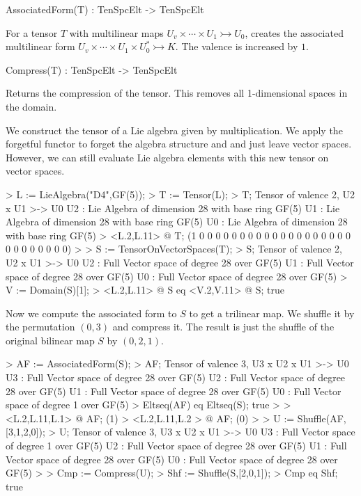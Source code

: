 
\begin{intrinsics}
AssociatedForm(T) : TenSpcElt -> TenSpcElt
\end{intrinsics}

For a tensor $T$ with multilinear maps $U_v\times \cdots \times U_1\rightarrowtail U_0$,
creates the associated multilinear form
$U_v\times\cdots\times U_1\times U_0^*\rightarrowtail K$.  The valence is increased
by $1$.

\begin{intrinsics}
Compress(T) : TenSpcElt -> TenSpcElt
\end{intrinsics}

Returns the compression of the tensor. This removes all 1-dimensional spaces 
in the domain.

\begin{example}
We construct the tensor of a Lie algebra given by multiplication. 
We apply the forgetful functor to forget the algebra structure and and just leave vector spaces.
However, we can still evaluate Lie algebra elements with this new tensor on vector spaces.

\begin{code}
> L := LieAlgebra("D4",GF(5));
> T := Tensor(L); 
> T;
Tensor of valence 2, U2 x U1 >-> U0
U2 : Lie Algebra of dimension 28 with base ring GF(5)
U1 : Lie Algebra of dimension 28 with base ring GF(5)
U0 : Lie Algebra of dimension 28 with base ring GF(5)
> <L.2,L.11> @ T;
(1 0 0 0 0 0 0 0 0 0 0 0 0 0 0 0 0 0 0 0 0 0 0 0 0 0 0 0)
> 
> S := TensorOnVectorSpaces(T);
> S;
Tensor of valence 2, U2 x U1 >-> U0
U2 : Full Vector space of degree 28 over GF(5)
U1 : Full Vector space of degree 28 over GF(5)
U0 : Full Vector space of degree 28 over GF(5)
> V := Domain(S)[1];
> <L.2,L.11> @ S eq <V.2,V.11> @ S;
true
\end{code}

Now we compute the associated form to $S$ to get a trilinear map. 
We shuffle it by the permutation $(0,3)$ and compress it.
The result is just the shuffle of the original bilinear map $S$ by $(0,2,1)$.

\begin{code}
> AF := AssociatedForm(S);
> AF;
Tensor of valence 3, U3 x U2 x U1 >-> U0
U3 : Full Vector space of degree 28 over GF(5)
U2 : Full Vector space of degree 28 over GF(5)
U1 : Full Vector space of degree 28 over GF(5)
U0 : Full Vector space of degree 1 over GF(5)
> Eltseq(AF) eq Eltseq(S);
true
> 
> <L.2,L.11,L.1> @ AF;
(1)
> <L.2,L.11,L.2 > @ AF;
(0)
> 
> U := Shuffle(AF,[3,1,2,0]);
> U;
Tensor of valence 3, U3 x U2 x U1 >-> U0
U3 : Full Vector space of degree 1 over GF(5)
U2 : Full Vector space of degree 28 over GF(5)
U1 : Full Vector space of degree 28 over GF(5)
U0 : Full Vector space of degree 28 over GF(5)
> 
> Cmp := Compress(U);
> Shf := Shuffle(S,[2,0,1]);
> Cmp eq Shf;
true
\end{code}
\end{example}


